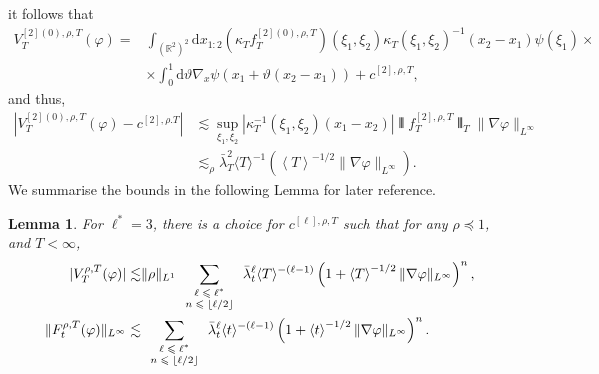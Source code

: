 \documentclass[11pt, a4paper]{scrartcl}
\numberwithin{equation}{section}
\theoremstyle{plain}
\newtheorem{lemma}[foo]{Lemma}
\theoremstyle{remark}
\newcommand{\mathd}{\mathrm{d}}
\newcommand{\tmscript}[1]{\text{\scriptsize{$#1$}}}
\begin{document}
it follows that
\begin{align*}
	V^{[2] (0), \rho, T}_T (\varphi) = &
	\int_{(\mathbb{R}^2)^2} \mathd
	x_{1 : 2} (\kappa_T f_T^{[2] (0), \rho, T}) (\xi_1, \xi_2) \kappa_T (\xi_1,
	\xi_2)^{- 1} (x_2 - x_1) \psi (\xi_1)\times                                    \\
	                                   & \times \int_0^1 \mathd \vartheta \nabla_x
	\psi (x_1 + \vartheta (x_2 - x_1)) + c^{[2], \rho, T},
\end{align*}
and thus,
\begin{equation}\label{eq:V2-bound}
	\begin{aligned}
		| V_T^{[2] (0), \rho, T} (\varphi) - c^{[2], \rho .T} | & \lesssim
		\sup_{\xi_1, \xi_2} | \kappa_T^{-1} (\xi_1, \xi_2) (x_1 - x_2) |  \interleave
		f_T^{[2], \rho, T} \interleave_T  \| \nabla \varphi \|_{L^{\infty}}                                                          \\
		                                                        & \lesssim_{\rho}  \bar{\lambda}_T^2 \langle T \rangle^{- 1}  \left(
		\left\langle T \right\rangle^{- 1 / 2} \| \nabla \varphi
		\|_{L^{\infty}} \right) .
	\end{aligned}
\end{equation}
We summarise the bounds in the following Lemma for later reference.
\begin{lemma}
	\label{lem:F2-W1-bounds}For $\ell^{\ast} = 3$, there is a choice for
	$c^{[\ell], \rho, T}$ such that for any $\rho \preceq  1$, and $T <
		\infty$,
	\begin{equation}
		\begin{aligned}
			| V_T^{\rho, T} (\varphi) | \lesssim                & \| \rho \|_{L^1}
			\sum_{\tmscript{\begin{array}{c}
						                \ell \leqslant \ell^{\ast} \\
						                n \leqslant \lfloor{\ell / 2}\rfloor
					                \end{array}}} \bar{\lambda}_t^{\ell} \langle T \rangle^{- (\ell - 1)}  \left(
			1 + \left\langle T \right\rangle^{- 1 / 2} \| \nabla
			\varphi \|_{L^{\infty}} \right)^n,                                     \\
			\| F_t^{\rho, T} (\varphi) \|_{L^{\infty}} \lesssim &
			\sum_{\tmscript{\begin{array}{c}
						                \ell \leqslant \ell^{\ast} \\
						                n \leqslant \lfloor{\ell / 2}\rfloor
					                \end{array}}} \bar{\lambda}_t^{\ell} \langle t \rangle^{- (\ell - 1)}  \left(
			1 + \left\langle t \right\rangle^{- 1 / 2} \| \nabla
			\varphi \|_{L^{\infty}} \right)^n .
		\end{aligned} \label{eq:F2-W1-bounds}
	\end{equation}
\end{lemma}
\end{document}

